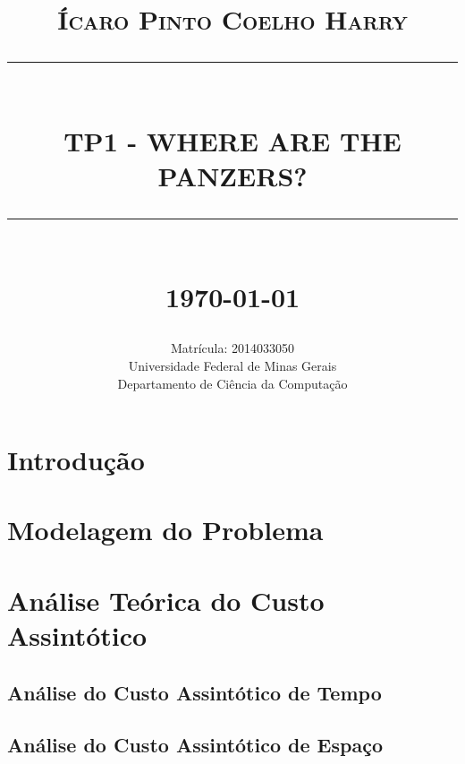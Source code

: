 \documentclass[12pt]{report}
\newcommand{\HRule}[1]{\rule{\linewidth}{#1}}
\begin{document}
\title{ \normalsize \textsc{Ícaro Pinto Coelho Harry}
        \\ [2.0cm]
        \HRule{0.5pt} \\
        \LARGE \textbf{\uppercase{TP1 - Where are the Panzers?}}
        \HRule{2pt} \\ [0.5cm]
        \normalsize \today \vspace*{5\baselineskip}}

\date{}

\author{
        Matrícula: 2014033050 \\ 
        Universidade Federal de Minas Gerais \\
        Departamento de Ciência da Computação }

\maketitle
\tableofcontents
\newpage

\sectionfont{\scshape}
\renewcommand{\thesection}{\arabic{section}}



\section{Introdução}
\lipsum

\section{Modelagem do Problema}
\lipsum

\section{Análise Teórica do Custo Assintótico}

\subsection{Análise do Custo Assintótico de Tempo}
\lipsum
\subsection{Análise do Custo Assintótico de Espaço}
\lipsum
\end{document}
